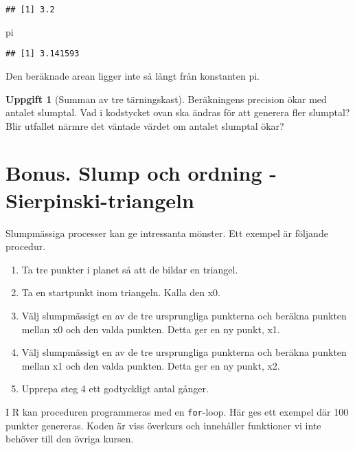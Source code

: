 \documentclass[
]{book}
\newenvironment{Shaded}{\begin{snugshade}}{\end{snugshade}}
\newcommand{\NormalTok}[1]{#1}
\providecommand{\tightlist}{%
  \setlength{\itemsep}{0pt}\setlength{\parskip}{0pt}}
\theoremstyle{definition}
\theoremstyle{definition}
\theoremstyle{definition}
\newtheorem{exercise}{Uppgift}[chapter]
\theoremstyle{definition}
\theoremstyle{remark}
\begin{document}
\begin{verbatim}
## [1] 3.2
\end{verbatim}

\begin{Shaded}
\begin{Highlighting}[]
\NormalTok{pi}
\end{Highlighting}
\end{Shaded}

\begin{verbatim}
## [1] 3.141593
\end{verbatim}

Den beräknade arean ligger inte så långt från konstanten pi.

\begin{exercise}[Summan av tre tärningskast]
Beräkningens precision ökar med antalet slumptal. Vad i kodstycket ovan ska ändras för att generera fler slumptal? Blir utfallet närmre det väntade värdet om antalet slumptal ökar?
\end{exercise}

\hypertarget{bonus.-slump-och-ordning---sierpinski-triangeln}{%
\section{Bonus. Slump och ordning - Sierpinski-triangeln}\label{bonus.-slump-och-ordning---sierpinski-triangeln}}

Slumpmässiga processer kan ge intressanta mönster. Ett exempel är följande procedur.

\begin{enumerate}
\def\labelenumi{\arabic{enumi}.}
\tightlist
\item
  Ta tre punkter i planet så att de bildar en triangel.
\item
  Ta en startpunkt inom triangeln. Kalla den x0.
\item
  Välj slumpmässigt en av de tre ursprungliga punkterna och beräkna punkten mellan x0 och den valda punkten. Detta ger en ny punkt, x1.
\item
  Välj slumpmässigt en av de tre ursprungliga punkterna och beräkna punkten mellan x1 och den valda punkten. Detta ger en ny punkt, x2.
\item
  Upprepa steg 4 ett godtyckligt antal gånger.
\end{enumerate}

I R kan proceduren programmeras med en \texttt{for}-loop. Här ges ett exempel där 100 punkter genereras. Koden är viss överkurs och innehåller funktioner vi inte behöver till den övriga kursen.
\end{document}
